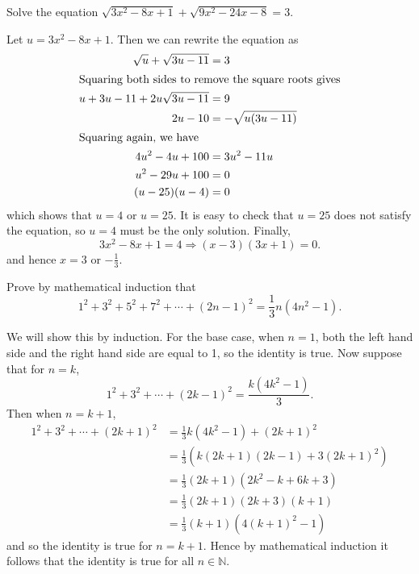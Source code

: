 \begin{question}
    Solve the equation $\sqrt{3x^2 - 8x + 1} + \sqrt{9x^2 - 24x - 8} = 3$.
\end{question}
\begin{solution}
    Let $u = 3x^2 - 8x + 1$. Then we can rewrite the equation as
    \begin{align*}
        \sqrt{u} + \sqrt{3u - 11} &= 3 \\
    \intertext{Squaring both sides to remove the square roots gives}
        u + 3u - 11 + 2u\sqrt{3u - 11} &= 9 \\
        2u - 10 &= -\sqrt{u(3u - 11)}\\
    \intertext{Squaring again, we have}
        4u^2 - 4u + 100 &= 3u^2 - 11u\\
        u^2 - 29u + 100 &= 0\\
        (u - 25)(u - 4) &= 0\\
    \end{align*}
    which shows that $u = 4$ or $u = 25$. It is easy to check that $u = 25$
    does not satisfy the equation, so $u = 4$ must be the only solution.
    Finally,
    \[ 3x^2 - 8x + 1 = 4 \Longrightarrow (x - 3)(3x + 1) = 0. \]
    and hence $x = 3$ or $-\frac{1}{3}$.
\end{solution}

\begin{question}
    Prove by mathematical induction that 
    \[1^2 + 3^2 + 5^2 + 7^2 + \cdots + (2n - 1)^2 = \frac{1}{3}n(4n^2 - 1).\] 
\end{question}
\begin{solution}
    We will show this by induction. For the base case, when $n = 1$, both the
    left hand side and the right hand side are equal to 1, so the identity is
    true. Now suppose that for $n = k$,
    \[ 1^2 + 3^2 + \cdots + (2k - 1)^2 = \frac{k(4k^2 - 1)}{3}. \]
    Then when $n = k + 1$,
    \begin{align*}
        1^2 + 3^2 + \cdots + (2k + 1)^2 &= \frac{1}{3}k(4k^2 - 1) + (2k + 1)^2\\
        &= \frac{1}{3}(k(2k + 1)(2k - 1) + 3(2k + 1)^2)\\
        &= \frac{1}{3}(2k + 1)(2k^2 - k + 6k + 3)\\
        &= \frac{1}{3}(2k + 1)(2k + 3)(k + 1)\\
        &= \frac{1}{3}(k + 1)(4(k + 1)^2 - 1)
    \end{align*}
    and so the identity is true for $n = k + 1$. Hence by mathematical
    induction it follows that the identity is true for all $n \in \mathbb{N}$.
\end{solution}

